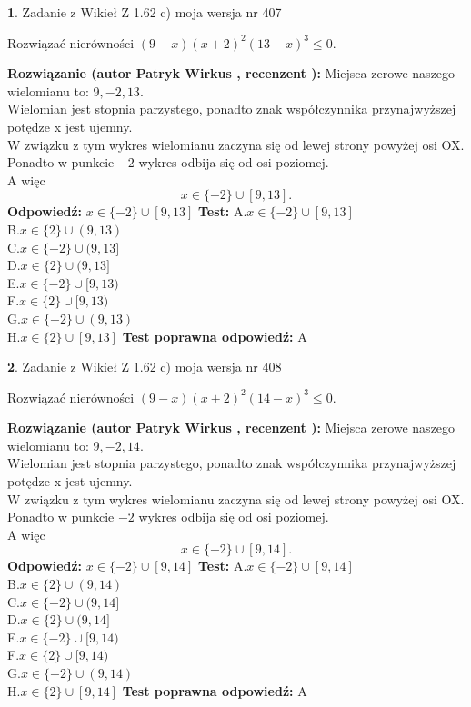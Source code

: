 \documentclass[12pt, a4paper]{article}
\theoremstyle{definition} %
\newtheorem{zad}{}
\newcommand{\zadStart}[1]{\begin{zad}#1\newline}
\newcommand{\zadStop}{\end{zad}}
\newcommand{\rozwStart}[2]{\noindent \textbf{Rozwiązanie (autor #1 , recenzent #2): }\newline}
\newcommand{\rozwStop}{\newline}
\newcommand{\odpStart}{\noindent \textbf{Odpowiedź:}\newline}
\newcommand{\odpStop}{\newline}
\newcommand{\testStart}{\noindent \textbf{Test:}\newline}
\newcommand{\testStop}{\newline}
\newcommand{\kluczStart}{\noindent \textbf{Test poprawna odpowiedź:}\newline}
\newcommand{\kluczStop}{\newline}
\begin{document}
\zadStart{Zadanie z Wikieł Z 1.62 c) moja wersja nr 407}

Rozwiązać nierówności $(9-x)(x+2)^{2}(13-x)^{3}\le0$.
\zadStop
\rozwStart{Patryk Wirkus}{}
Miejsca zerowe naszego wielomianu to: $9, -2, 13$.\\
Wielomian jest stopnia parzystego, ponadto znak współczynnika przy\linebreak najwyższej potędze x jest ujemny.\\ W związku z tym wykres wielomianu zaczyna się od lewej strony powyżej osi OX.\\
Ponadto w punkcie $-2$ wykres odbija się od osi poziomej.\\
A więc $$x \in \{-2\} \cup [9,13].$$
\rozwStop
\odpStart
$x \in \{-2\} \cup [9,13]$
\odpStop
\testStart
A.$x \in \{-2\} \cup [9,13]$\\
B.$x \in \{2\} \cup (9,13)$\\
C.$x \in \{-2\} \cup (9,13]$\\
D.$x \in \{2\} \cup (9,13]$\\
E.$x \in \{-2\} \cup [9,13)$\\
F.$x \in \{2\} \cup [9,13)$\\
G.$x \in \{-2\} \cup (9,13)$\\
H.$x \in \{2\} \cup [9,13]$
\testStop
\kluczStart
A
\kluczStop



\zadStart{Zadanie z Wikieł Z 1.62 c) moja wersja nr 408}

Rozwiązać nierówności $(9-x)(x+2)^{2}(14-x)^{3}\le0$.
\zadStop
\rozwStart{Patryk Wirkus}{}
Miejsca zerowe naszego wielomianu to: $9, -2, 14$.\\
Wielomian jest stopnia parzystego, ponadto znak współczynnika przy\linebreak najwyższej potędze x jest ujemny.\\ W związku z tym wykres wielomianu zaczyna się od lewej strony powyżej osi OX.\\
Ponadto w punkcie $-2$ wykres odbija się od osi poziomej.\\
A więc $$x \in \{-2\} \cup [9,14].$$
\rozwStop
\odpStart
$x \in \{-2\} \cup [9,14]$
\odpStop
\testStart
A.$x \in \{-2\} \cup [9,14]$\\
B.$x \in \{2\} \cup (9,14)$\\
C.$x \in \{-2\} \cup (9,14]$\\
D.$x \in \{2\} \cup (9,14]$\\
E.$x \in \{-2\} \cup [9,14)$\\
F.$x \in \{2\} \cup [9,14)$\\
G.$x \in \{-2\} \cup (9,14)$\\
H.$x \in \{2\} \cup [9,14]$
\testStop
\kluczStart
A
\kluczStop
\end{document}
